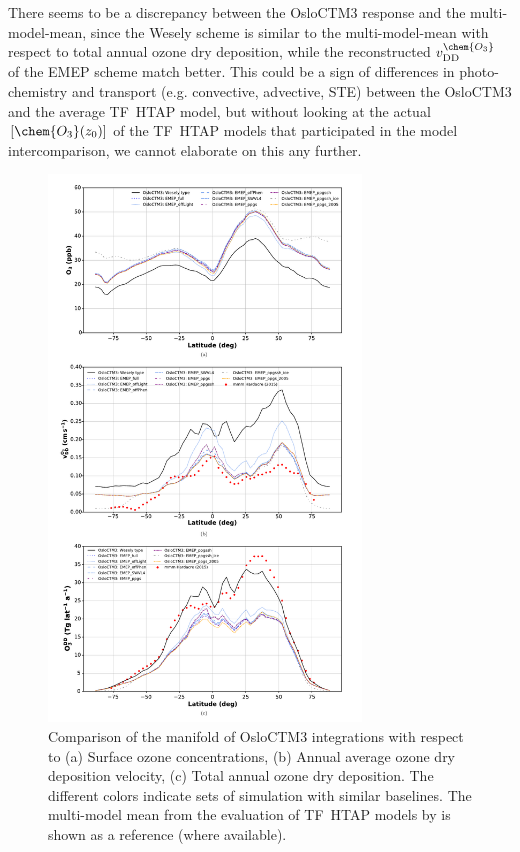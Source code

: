 \documentclass[gmd, manuscript]{copernicus}
\begin{document}
There seems to be a discrepancy between the OsloCTM3 response and the multi-model-mean, since the Wesely scheme is similar to the multi-model-mean with respect to total annual ozone dry deposition, while the reconstructed $v_\text{DD}^\chem{O_3}$ of the EMEP scheme match better. This could be a sign of differences in photo-chemistry and transport (e.g. convective, advective, STE) between the OsloCTM3 and the average TF~HTAP model, but without looking at the actual $[\chem{O_3}(z_0)]$ of the TF~HTAP models that participated in the model intercomparison, we cannot elaborate on this any further. 

\begin{figure}[t]
  \includegraphics[width=8.3cm]{fig05}
  \caption{Comparison of the manifold of OsloCTM3 integrations with respect to (a) Surface ozone concentrations, (b) Annual average ozone dry deposition velocity, (c) Total annual ozone dry deposition. The different colors indicate sets of simulation with similar baselines. The multi-model mean from the evaluation of TF~HTAP models by \citet{ACP:Hardacre2015} is shown as a reference (where available).}
  \label{fig:mmm_drydep}
\end{figure}
%
\end{document}
